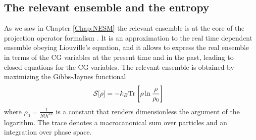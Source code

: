 \documentclass[b5paper,openright,10pt]{book}
\begin{document}
\begin{appendices}
\section{The relevant ensemble and the entropy}
As we saw in Chapter \ref{Chap:NESM}
the  relevant ensemble  is  at  the core  of  the projection  operator
formalism \cite{Grabert1982}. It is an  approximation to the real time
dependent  ensemble obeying  Liouville's  equation, and  it allows  to
express the real ensemble in terms  of the CG variables at the present
time and in the past, leading to closed equations for the CG variables.
The  relevant  ensemble is  obtained  by  maximizing the  Gibbs-Jaynes
functional
\begin{align}
  {\cal S}[\rho]=-k_B{\rm Tr}\left[\rho\ln\frac{\rho}{\rho_0}\right]
\end{align}
where   $\rho_0=\frac{1}{N!h^{3N}}$  is   a   constant  that   renders
dimensionless the argument of the  logarithm. The trace denotes
a macrocanonical sum over particles and an integration over phase space.


\end{appendices}
\end{document}
